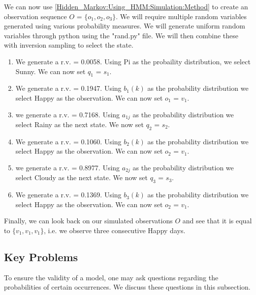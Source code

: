 \begin{example}
        We can now use \ref{Hidden_Markov:Using_HMM:Simulation:Method} to create an observation sequence   $O$ = $\{o_1, o_2, o_3\}$. We will require multiple random variables generated using various probability measures. We will generate uniform random variables through python using the "rand.py" file. We will then combine these with inversion sampling to select the state.

        \begin{enumerate}[i]
            \item We generate a r.v. = 0.0058. Using Pi as the probaility   distribution, we select Sunny. We can now set $q_1$ = $s_1$.
            \item We generate a r.v. = 0.1947. Using $b_1(k)$ as the    probability distribution we select Happy as the observation.   We can now set $o_1$ = $v_1$.
            \item we generate a r.v. = 0.7168. Using $a_{1j}$ as the    probability distribution we select Rainy as the next state.    We now set $q_2$ = $s_2$.
            \item We generate a r.v. = 0.1060. Using $b_2(k)$ as the    probability distribution we select Happy as the observation.   We can now set $o_2$ = $v_1$.
            \item we generate a r.v. = 0.8977. Using $a_{2j}$ as the    probability distribution we select Cloudy as the next state.   We now set $q_3$ = $s_3$.
            \item We generate a r.v. = 0.1369. Using $b_3(k)$ as the    probability distribution we select Happy as the observation.   We can now set $o_2$ = $v_1$.
        \end{enumerate}
        Finally, we can look back on our simulated observations $O$ and see that it is equal to $\{v_1,v_1,v_1\}$, i.e. we observe three consecutive Happy days.
    \end{example}


    \subsection{Key Problems}
    \label{Hidden_Markov:Using_HMM:Key_Problems}

    To ensure the validity of a model, one may ask questions regarding the probabilities of certain occurrences. We discuss these questions in this subsection.

